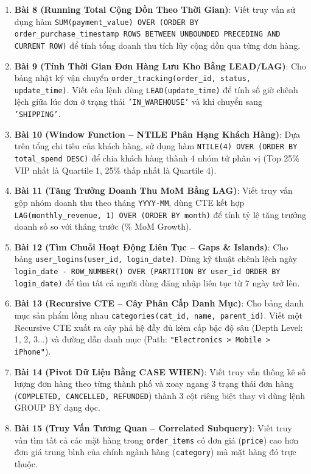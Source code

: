 \begin{baitapbox}
\begin{enumerate}
    \item \textbf{Bài 8 (Running Total Cộng Dồn Theo Thời Gian)}: Viết truy vấn sử dụng hàm \lstinline|SUM(payment_value) OVER (ORDER BY order_purchase_timestamp ROWS BETWEEN UNBOUNDED PRECEDING AND CURRENT ROW)| để tính tổng doanh thu tích lũy cộng dồn qua từng đơn hàng.
    \item \textbf{Bài 9 (Tính Thời Gian Đơn Hàng Lưu Kho Bằng LEAD/LAG)}: Cho bảng nhật ký vận chuyển \texttt{order\_tracking(order\_id, status, update\_time)}. Viết câu lệnh dùng \texttt{LEAD(update\_time)} để tính số giờ chênh lệch giữa lúc đơn ở trạng thái \texttt{'IN\_WAREHOUSE'} và khi chuyển sang \texttt{'SHIPPING'}.
    \item \textbf{Bài 10 (Window Function -- NTILE Phân Hạng Khách Hàng)}: Dựa trên tổng chi tiêu của khách hàng, sử dụng hàm \texttt{NTILE(4) OVER (ORDER BY total\_spend DESC)} để chia khách hàng thành 4 nhóm tứ phân vị (Top 25\% VIP nhất là Quartile 1, 25\% thấp nhất là Quartile 4).
    \item \textbf{Bài 11 (Tăng Trưởng Doanh Thu MoM Bằng LAG)}: Viết truy vấn gộp nhóm doanh thu theo tháng \texttt{YYYY-MM}, dùng CTE kết hợp \texttt{LAG(monthly\_revenue, 1) OVER (ORDER BY month)} để tính tỷ lệ tăng trưởng doanh số so với tháng trước (\% MoM Growth).
    \item \textbf{Bài 12 (Tìm Chuỗi Hoạt Động Liên Tục -- Gaps \& Islands)}: Cho bảng \texttt{user\_logins(user\_id, login\_date)}. Dùng kỹ thuật chênh lệch ngày \texttt{login\_date - ROW\_NUMBER() OVER (PARTITION BY user\_id ORDER BY login\_date)} để tìm tất cả người dùng đăng nhập liên tục từ 7 ngày trở lên.
    \item \textbf{Bài 13 (Recursive CTE -- Cây Phân Cấp Danh Mục)}: Cho bảng danh mục sản phẩm lồng nhau \texttt{categories(cat\_id, name, parent\_id)}. Viết một Recursive CTE xuất ra cây phả hệ đầy đủ kèm cấp bậc độ sâu (Depth Level: 1, 2, 3...) và đường dẫn danh mục (Path: \texttt{"Electronics > Mobile > iPhone"}).
    \item \textbf{Bài 14 (Pivot Dữ Liệu Bằng CASE WHEN)}: Viết truy vấn thống kê số lượng đơn hàng theo từng thành phố và xoay ngang 3 trạng thái đơn hàng (\texttt{COMPLETED, CANCELLED, REFUNDED}) thành 3 cột riêng biệt thay vì dùng lệnh GROUP BY dạng dọc.
    \item \textbf{Bài 15 (Truy Vấn Tương Quan -- Correlated Subquery)}: Viết truy vấn tìm tất cả các mặt hàng trong \texttt{order\_items} có đơn giá (\texttt{price}) cao hơn đơn giá trung bình của chính ngành hàng (\texttt{category}) mà mặt hàng đó trực thuộc.

\end{enumerate}
\end{baitapbox}
